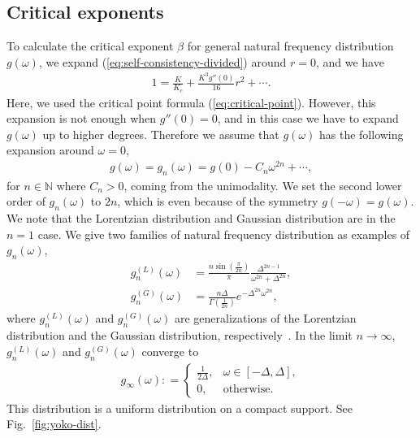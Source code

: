 \subsection{Critical exponents}
To calculate the critical exponent $\beta$ for general natural frequency distribution $g(\omega)$,
we expand (\ref{eq:self-consistency-divided}) around $r=0$, and we have
\begin{align}
  1=\frac{K}{K_{\mathrm{c}}}+\frac{K^{3}g''(0)}{16}r^{2}+\cdots.
\end{align}
Here, we used the critical point formula (\ref{eq:critical-point}).
However, this expansion is not enough when $g''(0)=0$,
and in this case we have to expand $g(\omega)$ up to higher degrees.
Therefore we assume that $g(\omega)$ has the following expansion around $\omega=0$,
\begin{align}
  g(\omega)=g_{n}(\omega)=g(0)-C_{n}\omega^{2n}+\cdots,
  \label{eq:g-n}
\end{align}
for $n\in\mathbb{N}$ where $C_{n}>0$, coming from the unimodality.
We set the second lower order of $g_{n}(\omega)$ to $2n$,
which is even because of the symmetry $g(-\omega)=g(\omega)$.
We note that the Lorentzian distribution and Gaussian distribution are
in the $n=1$ case.
We give two families of natural frequency distribution as examples of $g_{n}(\omega)$,
\begin{align}
  g^{(L)}_{n}(\omega)&=\frac{n\sin(\frac{\pi}{2n})}{\pi}\frac{\Delta^{2n-1}}{\omega^{2n}+\Delta^{2n}},\\
  g^{(G)}_{n}(\omega)&=\frac{n\Delta}{\Gamma(\frac{1}{2n})}e^{-\Delta^{2n}\omega^{2n}},
\end{align}
where $g^{(L)}_{n}(\omega)$ and $g^{(G)}_{n}(\omega)$ are generalizations
of the Lorentzian distribution and the Gaussian distribution, respectively~\cite{pietras2018}.
In the limit $n\to\infty$,
$g^{(L)}_{n}(\omega)$ and $g^{(G)}_{n}(\omega)$ converge to
\begin{align}
  g_{\infty}(\omega):
  =\begin{cases}
      \frac{1}{2\Delta},&\omega\in[-\Delta,\Delta],\\
      0,&\mathrm{otherwise}.
  \end{cases}
  \label{eq:g-infty}
\end{align}
This distribution is a uniform distribution on a compact support.
See Fig.~\ref{fig:yoko-dist}.
